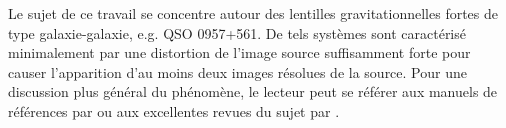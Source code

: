 
Le sujet de ce travail se concentre autour des lentilles gravitationnelles fortes de type galaxie-galaxie, e.g. QSO 0957+561. 
De tels systèmes sont caractérisé minimalement par une distortion de l'image source suffisamment forte pour causer 
l'apparition d'au moins deux images résolues de la source.
Pour une discussion plus général du phénomène, le lecteur peut se référer aux manuels de références par \citet{Meneghetti2013,Congdon2018} 
ou aux excellentes revues du sujet par \citet{Bartelmann2010,Treu2010}. 







